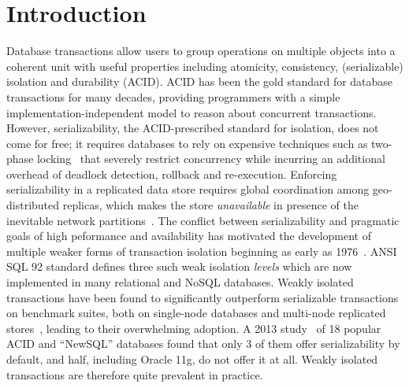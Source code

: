 \section{Introduction}

Database transactions allow users to group operations on multiple
objects into a coherent unit with useful properties including
atomicity, consistency, (serializable) isolation and durability
(ACID). ACID has been the gold standard for database transactions for
many decades, providing programmers with a simple
implementation-independent model to reason about concurrent
transactions. However, serializability, the ACID-prescribed standard for
isolation, does not come for free; it requires databases to rely on
expensive techniques such as two-phase locking~\cite{twopl,ullmanbook}
that severely restrict concurrency while incurring an additional
overhead of deadlock detection, rollback and re-execution. Enforcing
serializability in a replicated data store requires global
coordination among geo-distributed replicas, which makes the store
\emph{unavailable} in presence of the inevitable network
partitions~\cite{cap,sernotavlbl,bailishat,bernsigmod13}. The
conflict between serializability and pragmatic goals of high
peformance and availability has motivated the development of multiple
weaker forms of transaction isolation beginning as early as
1976~\cite{gray1976}. ANSI SQL 92 standard defines three such weak
isolation \emph{levels} which are now implemented in
many relational and NoSQL databases. Weakly isolated transactions have
been found to significantly outperform serializable transactions on
benchmark suites, both on single-node databases and multi-node
replicated stores~\cite{dbtuningbook,bailishat,bailisvldb}, leading to
their overwhelming adoption. A 2013 study~\cite{bailishotos} of 18
popular ACID and ``NewSQL'' databases found that only 3 of them offer
serializability by default, and half, including Oracle 11g, do not
offer it at all.  
Weakly isolated transactions are therefore quite prevalent in
practice.

